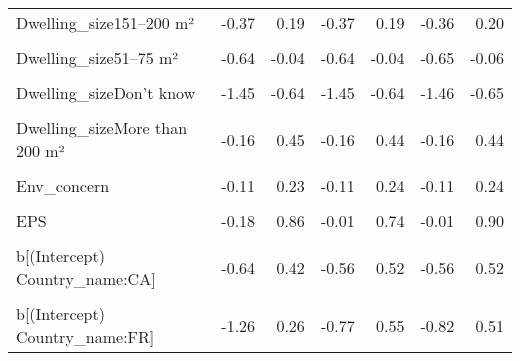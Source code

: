 \begin{table}
\begin{tabular}[t]{lrrrrrr}
Dwelling\_size151–200 m² & -0.37 & 0.19 & -0.37 & 0.19 & -0.36 & 0.20\\
\cellcolor{gray!10}{Dwelling\_size26–50 m²} & \cellcolor{gray!10}{-0.84} & \cellcolor{gray!10}{-0.05} & \cellcolor{gray!10}{-0.85} & \cellcolor{gray!10}{-0.05} & \cellcolor{gray!10}{-0.86} & \cellcolor{gray!10}{-0.04}\\
Dwelling\_size51–75 m² & -0.64 & -0.04 & -0.64 & -0.04 & -0.65 & -0.06\\
\cellcolor{gray!10}{Dwelling\_size76–100 m²} & \cellcolor{gray!10}{-0.44} & \cellcolor{gray!10}{0.07} & \cellcolor{gray!10}{-0.44} & \cellcolor{gray!10}{0.07} & \cellcolor{gray!10}{-0.42} & \cellcolor{gray!10}{0.07}\\
Dwelling\_sizeDon't know & -1.45 & -0.64 & -1.45 & -0.64 & -1.46 & -0.65\\
\cellcolor{gray!10}{Dwelling\_sizeLess than 25 m²} & \cellcolor{gray!10}{-1.28} & \cellcolor{gray!10}{0.17} & \cellcolor{gray!10}{-1.28} & \cellcolor{gray!10}{0.18} & \cellcolor{gray!10}{-1.28} & \cellcolor{gray!10}{0.17}\\
Dwelling\_sizeMore than 200 m² & -0.16 & 0.45 & -0.16 & 0.44 & -0.16 & 0.44\\
\cellcolor{gray!10}{Rural} & \cellcolor{gray!10}{0.01} & \cellcolor{gray!10}{0.42} & \cellcolor{gray!10}{0.02} & \cellcolor{gray!10}{0.40} & \cellcolor{gray!10}{0.01} & \cellcolor{gray!10}{0.41}\\
Env\_concern & -0.11 & 0.23 & -0.11 & 0.24 & -0.11 & 0.24\\
\cellcolor{gray!10}{Gov\_support} & \cellcolor{gray!10}{8.14} & \cellcolor{gray!10}{24.17} & \cellcolor{gray!10}{8.03} & \cellcolor{gray!10}{23.63} & \cellcolor{gray!10}{8.28} & \cellcolor{gray!10}{23.86}\\
EPS & -0.18 & 0.86 & -0.01 & 0.74 & -0.01 & 0.90\\
\cellcolor{gray!10}{b[(Intercept) Country\_name:BE]} & \cellcolor{gray!10}{-0.91} & \cellcolor{gray!10}{0.16} & \cellcolor{gray!10}{-0.73} & \cellcolor{gray!10}{0.48} & \cellcolor{gray!10}{-0.75} & \cellcolor{gray!10}{0.42}\\
b[(Intercept) Country\_name:CA] & -0.64 & 0.42 & -0.56 & 0.52 & -0.56 & 0.52\\
\cellcolor{gray!10}{b[(Intercept) Country\_name:CH]} & \cellcolor{gray!10}{-0.26} & \cellcolor{gray!10}{1.12} & \cellcolor{gray!10}{-0.53} & \cellcolor{gray!10}{0.75} & \cellcolor{gray!10}{-0.53} & \cellcolor{gray!10}{0.74}\\
b[(Intercept) Country\_name:FR] & -1.26 & 0.26 & -0.77 & 0.55 & -0.82 & 0.51\\

\end{tabular}
\end{table}
